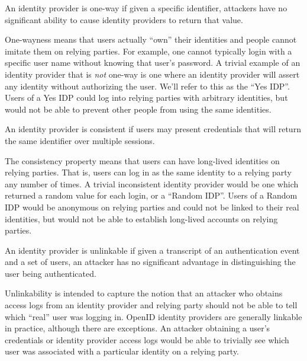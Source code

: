 \documentclass[11pt]{llncs}
\begin{document}
\begin{definition}
\label{def:ownership}
An identity provider is one-way if given a specific identifier,
attackers have no significant ability to cause identity providers to
return that value.
\end{definition}

One-wayness means that users actually ``own'' their identities and
people cannot imitate them on relying parties. For example, one cannot
typically login with a specific user name without knowing that user's
password. A trivial example of an identity provider that is
\textit{not} one-way is one where an identity provider will assert any
identity without authorizing the user.  We'll refer to this as the
``Yes IDP''. Users of a Yes IDP could log into relying parties with
arbitrary identities, but would not be able to prevent other people
from using the same identities.

\begin{definition}[Consistency]
\label{def:consistency}
An identity provider is consistent if users may present credentials
that will return the same identifier over multiple sessions.
\end{definition}

The consistency property means that users can have long-lived
identities on relying parties. That is, users can log in as the same
identity to a relying party any number of times. A trivial
inconsistent identity provider would be one which returned a random
value for each login, or a ``Random IDP''. Users of a Random IDP would
be anonymous on relying parties and could not be linked to their real
identities, but would not be able to establish long-lived accounts on
relying parties.

\begin{definition}[Unlinkability]
\label{def:unlinkability}
An identity provider is unlinkable if given a transcript of an
authentication event and a set of users, an attacker has no
significant advantage in distinguishing the user being authenticated.
\end{definition}

Unlinkability is intended to capture the notion that an attacker who
obtains access logs from an identity provider and relying party should
not be able to tell which ``real'' user was logging in. OpenID
identity providers are generally linkable in practice, although there
are exceptions. An attacker obtaining a user's credentials or identity provider
access logs would be able to trivially see which user was associated
with a particular identity on a relying party.
\end{document}
